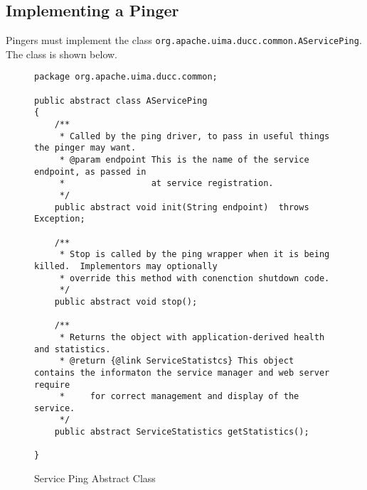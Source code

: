       \subsection{Implementing a Pinger}
      Pingers must implement the class {\tt org.apache.uima.ducc.common.AServicePing}.  The class
      is shown below.
      \begin{figure}[H]
\begin{verbatim}
package org.apache.uima.ducc.common;

public abstract class AServicePing
{
    /**
     * Called by the ping driver, to pass in useful things the pinger may want.
     * @param endpoint This is the name of the service endpoint, as passed in
     *                 at service registration.
     */
    public abstract void init(String endpoint)  throws Exception;

    /**
     * Stop is called by the ping wrapper when it is being killed.  Implementors may optionally
     * override this method with conenction shutdown code.
     */
    public abstract void stop();

    /**
     * Returns the object with application-derived health and statistics.
     * @return {@link ServiceStatistcs} This object contains the informaton the service manager and web server require
     *     for correct management and display of the service.
     */
    public abstract ServiceStatistics getStatistics();
    
}
\end{verbatim}
        \caption{Service Ping Abstract Class}
        \label{fig:service.abstract.pinger}

      \end{figure}
      
